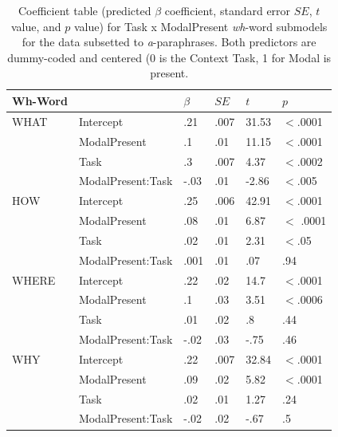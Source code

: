 \documentclass[12pt,letterpaper,table,svgnames,dvipsnames]{article}
\begin{document}
\begin{table}
\begin{center} 
\caption{Coefficient table (predicted $\beta$ coefficient, standard error $SE$, $t$ value, and $p$ value) for Task x ModalPresent \emph{wh}-word submodels for the data subsetted to \emph{a}-paraphrases. Both predictors are dummy-coded and centered (0 is the Context Task, 1 for Modal is present.} 
\label{sub-models_Task-a} 
\begin{tabular}{l|lllll} 
\toprule
Wh-Word & {} & $\beta$ & $SE$ & $t$ & $p$\\
\midrule
WHAT & Intercept & .21 & .007 & 31.53 & $<$.0001\\
{} & ModalPresent & .1 & .01 & 11.15 & $<$.0001\\
{} & Task & .3 & .007 & 4.37 & $<$.0002\\
{} & ModalPresent:Task & -.03 & .01 & -2.86 & $<$.005\\
\bottomrule
\toprule
HOW & Intercept & .25 & .006 & 42.91 & $<$.0001\\
{} & ModalPresent & .08 & .01 & 6.87 & $<$ .0001\\
{} & Task & .02 & .01 & 2.31 & $<$.05\\
{} & ModalPresent:Task & .001 & .01 & .07 & .94\\
\toprule
WHERE & Intercept & .22 & .02 & 14.7 & $<$.0001\\
{} & ModalPresent & .1 & .03 & 3.51 & $<$.0006\\
{} & Task & .01 & .02 & .8 & .44\\
{} & ModalPresent:Task & -.02 & .03 & -.75 & .46\\
\bottomrule
\toprule
WHY & Intercept & .22 & .007 & 32.84 & $<$.0001\\
{} & ModalPresent & .09 & .02 & 5.82 & $<$.0001\\
{} & Task & .02 & .01 & 1.27 & .24\\
{} & ModalPresent:Task & -.02 & .02 & -.67 & .5\\

\end{tabular}
\end{center}
\end{table}
\end{document}
